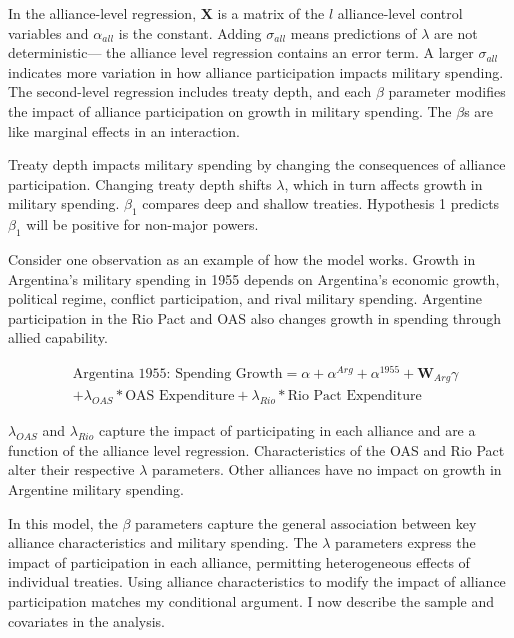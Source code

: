 \documentclass[12pt]{article}
\begin{document}
In the alliance-level regression, $\textbf{X}$ is a matrix of the $l$ alliance-level control variables and $\alpha_{all}$ is the constant.
Adding $\sigma_{all}$ means predictions of $\lambda$ are not deterministic--- the alliance level regression contains an error term. 
A larger $\sigma_{all}$ indicates more variation in how alliance participation impacts military spending. 
The second-level regression includes treaty depth, and each $\beta$ parameter modifies the impact of alliance participation on growth in military spending. 
The $\beta$s are like marginal effects in an interaction. 


Treaty depth impacts military spending by changing the consequences of alliance participation. 
Changing treaty depth shifts $\lambda$, which in turn affects growth in military spending.
$\beta_1$ compares deep and shallow treaties. 
Hypothesis 1 predicts $\beta_1$ will be positive for non-major powers.


Consider one observation as an example of how the model works. 
Growth in Argentina's military spending in 1955 depends on Argentina's economic growth, political regime, conflict participation, and rival military spending. 
Argentine participation in the Rio Pact and OAS also changes growth in spending through allied capability. 


\begin{equation}
\begin{split}
& \mbox{Argentina 1955: Spending Growth} = \alpha + \alpha^{Arg} + \alpha^{1955} +\textbf{W}_{Arg} \gamma \\
& + \lambda_{OAS} * \mbox{OAS Expenditure} + \lambda_{Rio} * \mbox{Rio Pact Expenditure}
\end{split} 
\end{equation}


$\lambda_{OAS}$ and $\lambda_{Rio}$ capture the impact of participating in each alliance and are a function of the alliance level regression. 
Characteristics of the OAS and Rio Pact alter their respective $\lambda$ parameters.
Other alliances have no impact on growth in Argentine military spending. 


In this model, the $\beta$ parameters capture the general association between key alliance characteristics and military spending. 
The $\lambda$ parameters express the impact of participation in each alliance, permitting heterogeneous effects of individual treaties. 
Using alliance characteristics to modify the impact of alliance participation matches my conditional argument. 
I now describe the sample and covariates in the analysis.  
\end{document}
